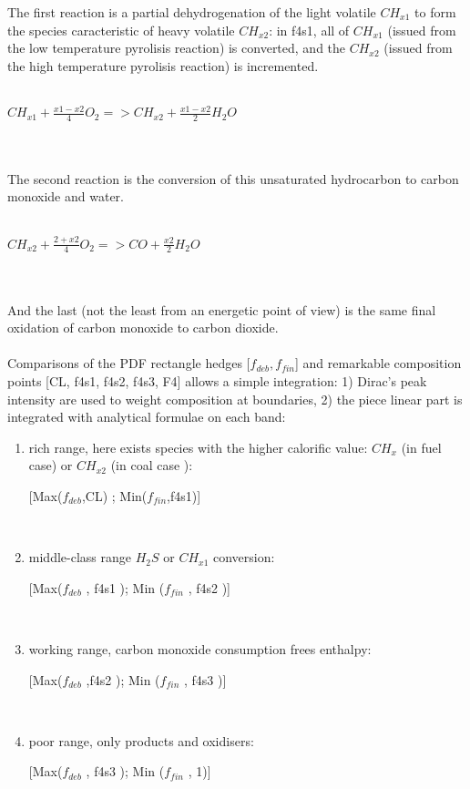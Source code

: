 The first reaction is a partial dehydrogenation of the light volatile
$CH_{x1}$ to form the species caracteristic of heavy volatile
$CH_{x2}$: in f4s1, all of $CH_{x1}$ ({\small issued from the low
temperature pyrolisis reaction}) is converted, and the $CH_{x2}$
({\small issued from the high temperature pyrolisis reaction}) is
incremented.\\
\\
\centerline{$CH_{x1} + \frac{x1-x2}{4} O_{2} => CH_{x2} + \frac{x1-x2}{2} H_{2}O $}\\
\\
The second reaction is the conversion of this unsaturated hydrocarbon
to carbon monoxide and water.\\
\\
\centerline{$CH_{x2} + \frac{2+x2}{4} O_{2} => CO + \frac{x2}{2} H_{2}O $}\\
\\
And the last ({\small not the least from an energetic point of view})
is the same final oxidation of carbon monoxide to carbon dioxide.\\
\\
Comparisons of the PDF rectangle hedges [$f_{deb} , f_{fin}$] and
remarkable composition points [CL, f4s1, f4s2, f4s3, F4] allows a
simple integration: 1) Dirac's peak intensity are used to weight
composition at boundaries, 2) the piece linear part is integrated with
analytical formulae on each band:\\
\begin{enumerate}
\item rich range, here exists species with the higher calorific value: $CH_{x}$ ({\small in fuel case}) or $CH_{x2}$ ({\small in coal case }):\\  \centerline{[Max($f_{deb}$,CL) ; Min($f_{fin}$,f4s1)]}\\
\item middle-class range $H_{2}S$ or $CH_{x1}$ conversion:\\
 \centerline{[Max($f_{deb}$ , f4s1 ); Min ($f_{fin}$ , f4s2 )]}\\
\item working range, carbon monoxide consumption frees enthalpy:\\ \centerline{ [Max($f_{deb}$ ,f4s2 ); Min ($f_{fin}$ , f4s3 )]}\\
\item poor range, only products and oxidisers:\\ \centerline{ [Max($f_{deb}$ , f4s3 ); Min ($f_{fin}$ , 1)]}\\
\end{enumerate}

